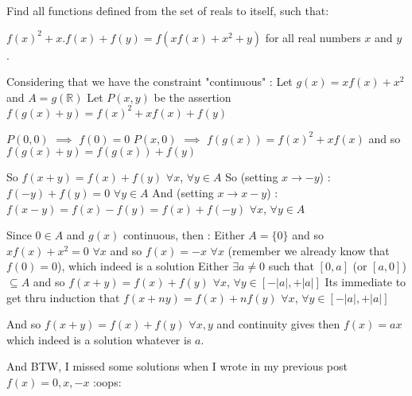 


\begin{solution}
	\begin{tcolorbox}Find all functions defined from the set of reals to itself, such that: 

$f(x)^2+x.f(x)+f(y)=f(xf(x)+x^2+y) $ for all real numbers $x$ and $y$ .\end{tcolorbox}
Considering that we have the constraint "continuous" :
Let $g(x)=xf(x)+x^2$ and $A=g(\mathbb R)$
Let $P(x,y)$ be the assertion $f(g(x)+y)=f(x)^2+xf(x)+f(y)$

$P(0,0)$ $\implies$ $f(0)=0$
$P(x,0)$ $\implies$ $f(g(x))=f(x)^2+xf(x)$ and so $f(g(x)+y)=f(g(x))+f(y)$

So $f(x+y)=f(x)+f(y)$ $\forall x$, $\forall y\in A$
So (setting $x\to -y$) : $f(-y)+f(y)=0$ $\forall y\in A$
And (setting $x\to x-y$) : $f(x-y)=f(x)-f(y)=f(x)+f(-y)$ $\forall x$, $\forall y\in A$

Since $0\in A$ and $g(x)$ continuous, then :
Either $A=\{0\}$ and so $xf(x)+x^2=0$ $\forall x$ and so $f(x)=-x$ $\forall x$ (remember we already know that $f(0)=0$), which indeed is a solution
Either $\exists a\ne 0$ such that $[0,a]$ (or $[a,0]$) $\subseteq A$ and so $f(x+y)=f(x)+f(y)$ $\forall x$, $\forall y\in [-|a|,+|a|]$ 
Its immediate to get  thru induction that $f(x+ny)=f(x)+nf(y)$ $\forall x$, $\forall y\in [-|a|,+|a|]$ 

And so $f(x+y)=f(x)+f(y)$ $\forall x,y$ and continuity gives then $\boxed{f(x)=ax}$ which indeed is a solution whatever is $a$.

And BTW, I missed some solutions when I wrote in my previous post $f(x)=0,x,-x$ :oops:
\end{solution}



